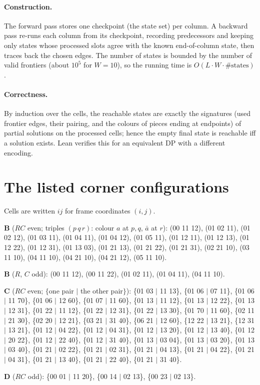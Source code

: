 \documentclass[11pt]{article}
\begin{document}
\paragraph{Construction.} The forward pass stores one checkpoint (the state set) per column. A
backward pass re-runs each column from its checkpoint, recording predecessors and keeping only
states whose processed slots agree with the known end-of-column state, then traces back the chosen
edges. The number of states is bounded by the number of valid frontiers (about $10^5$ for
$W = 10$), so the running time is $O(L \cdot W \cdot \#\text{states})$.

\paragraph{Correctness.} By induction over the cells, the reachable states are exactly the
signatures (used frontier edges, their pairing, and the colours of pieces ending at endpoints) of
partial solutions on the processed cells; hence the empty final state is reachable iff a solution
exists. Lean verifies this for an equivalent DP with a different encoding.

\section{The listed corner configurations}\label{app:lists}

Cells are written $ij$ for frame coordinates $(i, j)$.

\noindent\textbf{B} ($RC$ even; triples $(p\,q\,r)$: colour $a$ at $p, q$, $\bar a$ at $r$):
(00 11 12), (01 02 11), (01 02 12), (01 03 11), (01 04 11), (01 04 12), (01 05 11), (01 12 11),
(01 12 13), (01 12 22), (01 12 31), (01 13 03), (01 21 13), (01 21 22), (01 21 31), (02 21 10),
(03 11 10), (04 11 10), (04 21 10), (04 21 12), (05 11 10).

\noindent\textbf{B} ($R$, $C$ odd): (00 11 12), (00 11 22), (01 02 11), (01 04 11), (04 11 10).

\noindent\textbf{C} ($RC$ even; $\{$one pair $\mid$ the other pair$\}$):
\{01 03 $\mid$ 11 13\}, \{01 06 $\mid$ 07 11\}, \{01 06 $\mid$ 11 70\}, \{01 06 $\mid$ 12 60\},
\{01 07 $\mid$ 11 60\}, \{01 13 $\mid$ 11 12\}, \{01 13 $\mid$ 12 22\}, \{01 13 $\mid$ 12 31\},
\{01 22 $\mid$ 11 12\}, \{01 22 $\mid$ 12 31\}, \{01 22 $\mid$ 13 30\}, \{01 70 $\mid$ 11 60\},
\{02 11 $\mid$ 21 30\}, \{02 20 $\mid$ 12 21\}, \{03 21 $\mid$ 31 40\}, \{06 21 $\mid$ 12 60\},
\{12 22 $\mid$ 13 21\}, \{12 31 $\mid$ 13 21\}, \{01 12 $\mid$ 04 22\}, \{01 12 $\mid$ 04 31\},
\{01 12 $\mid$ 13 20\}, \{01 12 $\mid$ 13 40\}, \{01 12 $\mid$ 20 22\}, \{01 12 $\mid$ 22 40\},
\{01 12 $\mid$ 31 40\}, \{01 13 $\mid$ 03 04\}, \{01 13 $\mid$ 03 20\}, \{01 13 $\mid$ 03 40\},
\{01 21 $\mid$ 02 22\}, \{01 21 $\mid$ 02 31\}, \{01 21 $\mid$ 04 13\}, \{01 21 $\mid$ 04 22\},
\{01 21 $\mid$ 04 31\}, \{01 21 $\mid$ 13 40\}, \{01 21 $\mid$ 22 40\}, \{01 21 $\mid$ 31 40\}.

\noindent\textbf{D} ($RC$ odd): \{00 01 $\mid$ 11 20\}, \{00 14 $\mid$ 02 13\}, \{00 23 $\mid$ 02 13\}.
\end{document}
